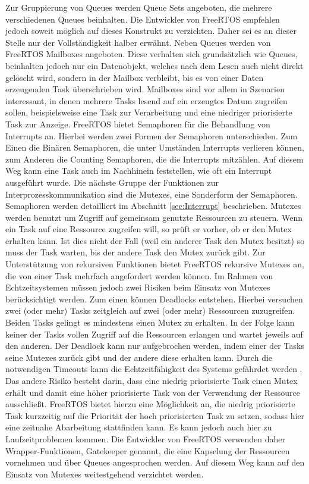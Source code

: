Zur Gruppierung von Queues werden Queue Sets angeboten, die mehrere verschiedenen Queues beinhalten. Die Entwickler von FreeRTOS empfehlen jedoch soweit möglich auf dieses Konstrukt zu verzichten. Daher sei es an dieser Stelle nur der Voll\-stän\-dig\-keit halber erwähnt. Neben Queues werden von FreeRTOS Mailboxes angeboten. Diese verhalten sich grund\-sätz\-lich wie Queues, beinhalten jedoch nur ein Datenobjekt, welches nach dem Lesen auch nicht direkt gelöscht wird, sondern in der Mailbox verbleibt, bis es von einer Daten erzeugenden Task überschrieben wird. Mailboxes sind vor allem in Szenarien interessant, in denen mehrere Tasks lesend auf ein erzeugtes Datum zugreifen sollen, beispielsweise eine Task zur Verarbeitung und eine niedriger priorisierte Task zur Anzeige.
FreeRTOS bietet Semaphoren für die Behandlung von Interrupts an. Hierbei werden zwei Formen der Semaphoren unterschieden. Zum Einen die Binären Semaphoren, die unter Umständen Interrupts verlieren können, zum Anderen die Counting Semaphoren, die die Interrupts mitzählen. Auf diesem Weg kann eine Task auch im Nachhinein feststellen, wie oft ein Interrupt ausgeführt wurde.
Die nächste Gruppe der Funktionen zur Interprozesskommunikation sind die Mutexes, eine Sonderform der Semaphoren. Semaphoren werden detailliert im Abschnitt \ref{sec:Interrupt} beschrieben. Mutexes werden benutzt um Zugriff auf gemeinsam genutzte Ressourcen zu steuern. Wenn ein Task auf eine Ressource zugreifen will, so prüft er vorher, ob er den Mutex erhalten kann. Ist dies nicht der Fall (weil ein anderer Task den Mutex besitzt) so muss der Task warten, bis der andere Task den Mutex zurück gibt. Zur Unterstützung von rekursiven Funktionen bietet FreeRTOS rekursive Mutexes an, die von einer Task mehrfach angefordert werden können. Im Rahmen von Echtzeitsystemen müssen jedoch zwei Risiken beim Einsatz von Mutexes berücksichtigt werden. Zum einen können Deadlocks entstehen. Hierbei versuchen zwei (oder mehr) Tasks zeitgleich auf zwei (oder mehr) Ressourcen zuzugreifen. Beiden Tasks gelingt es mindestens einen Mutex zu erhalten. In der Folge kann keiner der Tasks vollen Zugriff auf die Ressourcen erlangen und wartet jeweils auf den anderen. Der Deadlock kann nur aufgebrochen werden, indem einer der Tasks seine Mutexes zurück gibt und der andere diese erhalten kann. Durch die notwendigen Timeouts kann die Echt\-zeit\-fähig\-keit des Systems gefährdet werden . %
Das andere Risiko besteht darin, dass eine niedrig priorisierte Task einen Mutex erhält und damit eine höher priorisierte Task von der Verwendung der Ressource ausschließt. FreeRTOS bietet hierzu eine Möglichkeit an, die niedrig priorisierte Task kurzzeitig auf die Priorität der hoch priorisierten Task zu setzen, sodass hier eine zeitnahe Abarbeitung stattfinden kann. Es kann jedoch auch hier zu Laufzeitproblemen kommen. Die Entwickler von FreeRTOS verwenden daher Wrapper-Funktionen, Gatekeeper genannt, die eine Kapselung der Ressourcen vornehmen und über Queues angesprochen werden. Auf diesem Weg kann auf den Einsatz von Mutexes weitestgehend verzichtet werden.
